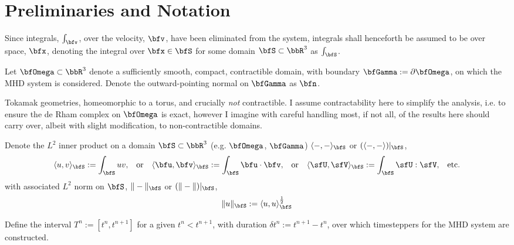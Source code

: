 \section*{Preliminaries and Notation}
    Since integrals, $\int_{\bfv}$, over the velocity, $\bfv$, have been eliminated from the system, integrals shall henceforth be assumed to be over space, $\bfx$, denoting the integral over $\bfx  \in  \bfS$ for some domain $\bfS  \subset  \bbR^{3}$ as $\int_{\bfS}$.

    Let $\bfOmega  \subset  \bbR^{3}$ denote a sufficiently smooth, compact, contractible domain, with boundary $\bfGamma  :=  \partial\bfOmega$, on which the MHD system is considered. Denote the outward-pointing normal on $\bfGamma$ as $\bfn$.

    \begin{remark}
        Tokamak geometries, homeomorphic to a torus, and crucially \emph{not} contractible. I assume contractability here to simplify the analysis, i.e. to ensure the de Rham complex on $\bfOmega$ is exact, however I imagine with careful handling most, if not all, of the results here should carry over, albeit with slight modification, to non-contractible domains.
    \end{remark}
    
    Denote the $L^{2}$ inner product on a domain $\bfS  \subset  \bbR^{3}$ (e.g. $\bfOmega$, $\bfGamma$) $\langle-, -\rangle_{\bfS}$ or $(\langle-, -\rangle)|_{\bfS}$,
    \begin{align}
        \langle u,    v   \rangle_{\bfS}  :=  \int_{\bfS}uv,  &&
        \text{or}  &&
        \langle \bfu, \bfv\rangle_{\bfS}  :=  \int_{\bfS}\bfu\cdot\bfv,  &&
        \text{or}  &&
        \langle \sfU, \sfV\rangle_{\bfS}  :=  \int_{\bfS}\sfU:\sfV,  &&
        \text{etc.}
    \end{align}
    with associated $L^{2}$ norm on $\bfS$, $\|-\|_{\bfS}$ or $(\|-\|)|_{\bfS}$,
    \begin{equation}
        \|u\|_{\bfS}  :=  \langle u, u\rangle_{\bfS}^{\frac{1}{2}}
    \end{equation}

    Define the interval $T^{n}  :=  \left[t^{n}, t^{n + 1}\right]$ for a given $t^{n}  <  t^{n + 1}$, with duration $\delta t^{n}  :=  t^{n + 1} - t^{n}$, over which timesteppers for the MHD system are constructed.
    